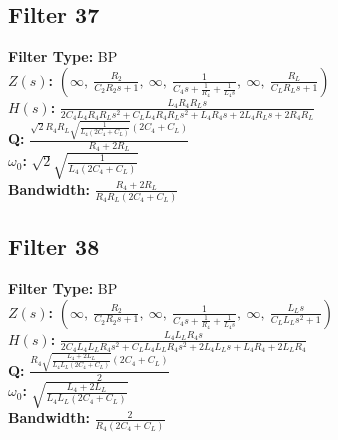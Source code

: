 \documentclass{article}
\begin{document}
\subsection*{Filter 37}
\textbf{Filter Type:} BP \\ 
\textbf{$Z(s)$:} $\left( \infty, \  \frac{R_{2}}{C_{2} R_{2} s + 1}, \  \infty, \  \frac{1}{C_{4} s + \frac{1}{R_{4}} + \frac{1}{L_{4} s}}, \  \infty, \  \frac{R_{L}}{C_{L} R_{L} s + 1}\right)$ \\ 
\textbf{$H(s)$:} $\frac{L_{4} R_{4} R_{L} s}{2 C_{4} L_{4} R_{4} R_{L} s^{2} + C_{L} L_{4} R_{4} R_{L} s^{2} + L_{4} R_{4} s + 2 L_{4} R_{L} s + 2 R_{4} R_{L}}$ \\ 
\textbf{Q:} $\frac{\sqrt{2} R_{4} R_{L} \sqrt{\frac{1}{L_{4} \left(2 C_{4} + C_{L}\right)}} \left(2 C_{4} + C_{L}\right)}{R_{4} + 2 R_{L}}$ \\ 
\textbf{$\omega_0$:} $\sqrt{2} \sqrt{\frac{1}{L_{4} \left(2 C_{4} + C_{L}\right)}}$ \\ 
\textbf{Bandwidth:} $\frac{R_{4} + 2 R_{L}}{R_{4} R_{L} \left(2 C_{4} + C_{L}\right)}$ \\ 
\subsection*{Filter 38}
\textbf{Filter Type:} BP \\ 
\textbf{$Z(s)$:} $\left( \infty, \  \frac{R_{2}}{C_{2} R_{2} s + 1}, \  \infty, \  \frac{1}{C_{4} s + \frac{1}{R_{4}} + \frac{1}{L_{4} s}}, \  \infty, \  \frac{L_{L} s}{C_{L} L_{L} s^{2} + 1}\right)$ \\ 
\textbf{$H(s)$:} $\frac{L_{4} L_{L} R_{4} s}{2 C_{4} L_{4} L_{L} R_{4} s^{2} + C_{L} L_{4} L_{L} R_{4} s^{2} + 2 L_{4} L_{L} s + L_{4} R_{4} + 2 L_{L} R_{4}}$ \\ 
\textbf{Q:} $\frac{R_{4} \sqrt{\frac{L_{4} + 2 L_{L}}{L_{4} L_{L} \left(2 C_{4} + C_{L}\right)}} \left(2 C_{4} + C_{L}\right)}{2}$ \\ 
\textbf{$\omega_0$:} $\sqrt{\frac{L_{4} + 2 L_{L}}{L_{4} L_{L} \left(2 C_{4} + C_{L}\right)}}$ \\ 
\textbf{Bandwidth:} $\frac{2}{R_{4} \left(2 C_{4} + C_{L}\right)}$ \\ 
\end{document}
